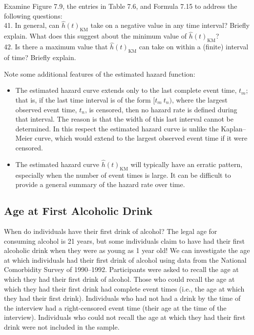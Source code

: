\documentclass[
]{report}
\providecommand{\tightlist}{%
  \setlength{\itemsep}{0pt}\setlength{\parskip}{0pt}}
\begin{document}
Examine Figure 7.9, the entries in Table 7.6, and Formula 7.15 to address the following questions:\\
41. In general, can \(\scriptstyle \hat h(t)_{\mathrm{KM}}\) take on a negative value in any time interval? Briefly explain. What does this suggest about the minimum value of \(\scriptstyle \hat h(t)_{\mathrm{KM}}\)?\\
42. Is there a maximum value that \(\scriptstyle \hat h(t)_{\mathrm{KM}}\) can take on within a (finite) interval of time? Briefly explain.

Note some additional features of the estimated hazard function:

\begin{itemize}
\tightlist
\item
  The estimated hazard curve extends only to the last complete event time, \(\scriptstyle t_m\); that is, if the last time interval is of the form \(\scriptstyle [t_m \ t_n)\), where the largest observed event time, \(\scriptstyle t_n\), is censored, then no hazard rate is defined during that interval. The reason is that the width of this last interval cannot be determined. In this respect the estimated hazard curve is unlike the Kaplan--Meier curve, which would extend to the largest observed event time if it were censored.\\
\item
  The estimated hazard curve \(\scriptstyle \hat h(t)_{\mathrm{KM}}\) will typically have an erratic pattern, especially when the number of event times is large. It can be difficult to provide a general summary of the hazard rate over time.
\end{itemize}

\hypertarget{age-at-first-alcoholic-drink}{%
\subsection*{Age at First Alcoholic Drink}\label{age-at-first-alcoholic-drink}}

When do individuals have their first drink of alcohol? The legal age for consuming alcohol is 21 years, but some individuals claim to have had their first alcoholic drink when they were as young as 1 year old! We can investigate the age at which individuals had their first drink of alcohol using data from the National Comorbidity Survey of 1990--1992. Participants were asked to recall the age at which they had their first drink of alcohol. Those who could recall the age at which they had their first drink had complete event times (i.e., the age at which they had their first drink). Individuals who had not had a drink by the time of the interview had a right-censored event time (their age at the time of the interview). Individuals who could not recall the age at which they had their first drink were not included in the sample.
\end{document}
